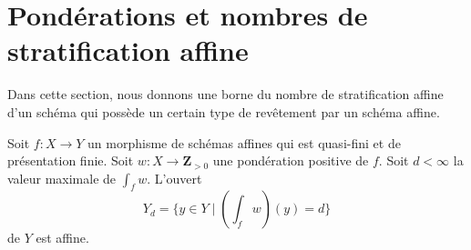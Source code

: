 \section{Pondérations et nombres de stratification affine}
\label{section-bounds-asn}

\noindent
Dans cette section, nous donnons une borne du nombre de stratification affine d'un
schéma qui possède un certain type de revêtement par un schéma affine.

\begin{lemma}
\label{lemma-affineness-of-large-open}
Soit $f : X \to Y$ un morphisme de schémas affines qui est
quasi-fini et de présentation finie.
Soit $w : X \to \mathbf{Z}_{> 0}$ une pondération positive de $f$.
Soit $d < \infty$ la valeur maximale de $\int_f w$. L'ouvert
$$
Y_d = \{y \in Y \mid (\textstyle{\int}_f w)(y) = d \}
$$
de $Y$ est affine.
\end{lemma}

